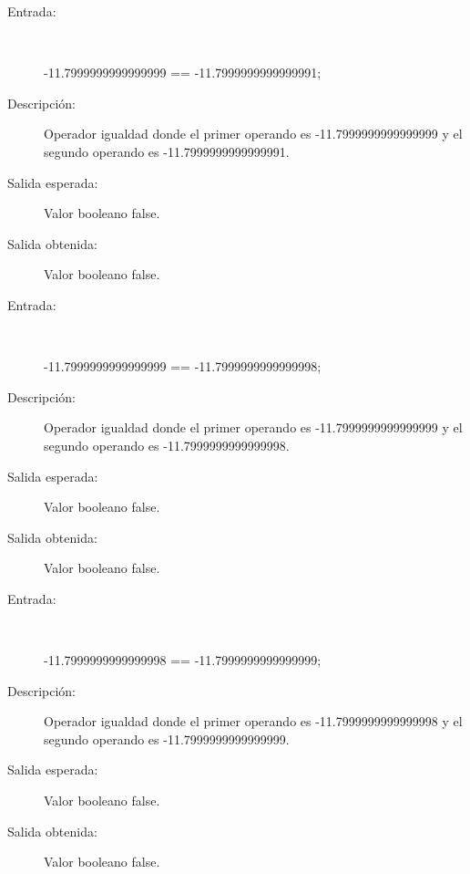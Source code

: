 	\begin{description}
		\item [Entrada:] \hfill \\
\begin{myverbatim}
 -11.7999999999999999 == -11.7999999999999991;
\end{myverbatim}
		\item [Descripción:] Operador igualdad donde el primer operando es -11.7999999999999999 y el segundo operando es  -11.7999999999999991.
		\item [Salida esperada:] Valor booleano false.
		\item [Salida obtenida:] Valor booleano false.
	\end{description}

	\begin{description}
		\item [Entrada:] \hfill \\
\begin{myverbatim}
 -11.7999999999999999 == -11.7999999999999998;
\end{myverbatim}
		\item [Descripción:] Operador igualdad donde el primer operando es -11.7999999999999999 y el segundo operando es  -11.7999999999999998.
		\item [Salida esperada:] Valor booleano false.
		\item [Salida obtenida:] Valor booleano false.
	\end{description}

	\begin{description}
		\item [Entrada:] \hfill \\
\begin{myverbatim}
 -11.7999999999999998 == -11.7999999999999999;
\end{myverbatim}
		\item [Descripción:] Operador igualdad donde el primer operando es -11.7999999999999998 y el segundo operando es  -11.7999999999999999.
		\item [Salida esperada:] Valor booleano false.
		\item [Salida obtenida:] Valor booleano false.
	\end{description}

